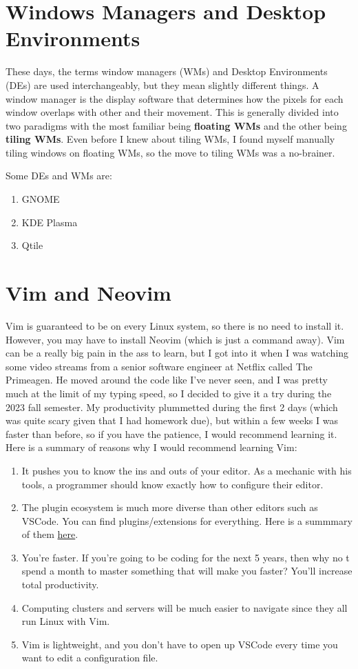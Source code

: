 \documentclass{article}
\begin{document}
\section{Windows Managers and Desktop Environments}

  These days, the terms window managers (WMs) and Desktop Environments (DEs) are used interchangeably, but they mean slightly different things. A window manager is the display software that determines how the pixels for each window overlaps with other and their movement. This is generally divided into two paradigms with the most familiar being \textbf{floating WMs} and the other being \textbf{tiling WMs}. Even before I knew about tiling WMs, I found myself manually tiling windows on floating WMs, so the move to tiling WMs was a no-brainer. 
  
  Some DEs and WMs are: 
  \begin{enumerate}
    \item GNOME 
    \item KDE Plasma
    \item Qtile
  \end{enumerate}

\section{Vim and Neovim}

  Vim is guaranteed to be on every Linux system, so there is no need to install it. However, you may have to install Neovim (which is just a command away). Vim can be a really big pain in the ass to learn, but I got into it when I was watching some video streams from a senior software engineer at Netflix called The Primeagen. He moved around the code like I've never seen, and I was pretty much at the limit of my typing speed, so I decided to give it a try during the 2023 fall semester. My productivity plummetted during the first 2 days (which was quite scary given that I had homework due), but within a few weeks I was faster than before, so if you have the patience, I would recommend learning it. Here is a summary of reasons why I would recommend learning Vim: 
  \begin{enumerate}
    \item It pushes you to know the ins and outs of your editor. As a mechanic with his tools, a programmer should know exactly how to configure their editor.  
    \item The plugin ecosystem is much more diverse than other editors such as VSCode. You can find plugins/extensions for everything. Here is a summmary of them \href{https://github.com/rockerBOO/awesome-neovim\#neovim-lua-development}{here}. 
    \item You're faster. If you're going to be coding for the next 5 years, then why no t spend a month to master something that will make you faster? You'll increase total productivity. 
    \item Computing clusters and servers will be much easier to navigate since they all run Linux with Vim. 
    \item Vim is lightweight, and you don't have to open up VSCode every time you want to edit a configuration file.  
  \end{enumerate}
\end{document}
